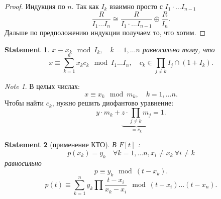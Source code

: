 \documentclass[11pt]{book}
\newcommand{\slim}{\sum\limits}
\theoremstyle{definition}
\theoremstyle{plain}
\theoremstyle{plain}
\newtheorem*{st}{Statement}
\theoremstyle{definition}
\theoremstyle{remark}
\newtheorem*{note}{Note}
\begin{document}
\begin{proof}
    Индукция по $ n$.
    Так как $ I_k$ взаимно просто с  $ I_1\cdot \ldots I_{n-1}$
    \[
	\frac{R}{I_1 \ldots I_n} \cong \frac{R}{I_1 \cdot \ldots I_{n-1} } \oplus \frac{R}{I_n}
    .\] 
    Дальше по предположению индукции получаем то, что хотим.
\end{proof}
\begin{st}
 $ x \equiv x_k \mod I_k, \quad k = 1, \ldots n$ равносильно тому, что \[
	x \equiv \slim_{k=1}^{n} x_k c_k \mod I_1 \ldots I_n, \quad c_k \in  \prod_{j \ne k} I_j \cap (1 + I_k)
    .\] 
\end{st}
\begin{note}
    В целых числах:
    \[
    x \equiv x_k \mod m_k, \quad k = 1, \ldots  n
    .\] 
    Чтобы найти $ c_k$, нужно решить диофантово уравнение:
    \[
	y \cdot m_k + \underbrace{z \cdot \prod_{j \ne k} m_j}_{=c_k} = 1 
    .\] 
\end{note}
\begin{st}[применение КТО]
    В $ F[t]$ :
    \[
	p(x_k) = y_k \quad \forall  k = 1, \ldots n, x_i \ne x_k  ~ \forall  i \ne k
    \] 
равносильно
    \[
	p \equiv y_k \mod (t - x_k)    
    .\] 
    \[
	p(t) \equiv \slim_{k=1}^{n} y_k \prod \frac{t -x_i}{x_k - x_i} \mod (t - x_i) \ldots (t - x_n)
    .\] 
\end{st}
\end{document}
